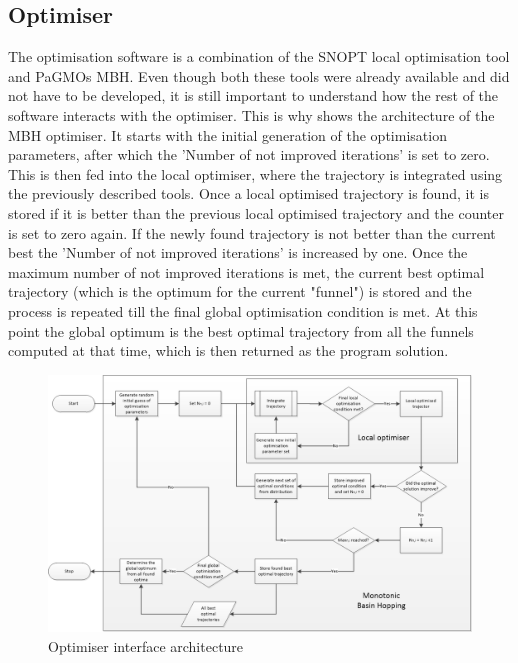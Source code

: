 \subsection{Optimiser}
\label{subsec:optimisersoft}
The optimisation software is a combination of the \ac{SNOPT} local optimisation tool and \ac{PaGMO}s \ac{MBH}. Even though both these tools were already available and did not have to be developed, it is still important to understand how the rest of the software interacts with the optimiser. This is why   shows the architecture of the \ac{MBH} optimiser. It starts with the initial generation of the optimisation parameters, after which the 'Number of not improved iterations' is set to zero. This is then fed into the local optimiser, where the trajectory is integrated using the previously described tools. Once a local optimised trajectory is found, it is stored if it is better than the previous local optimised trajectory and the counter is set to zero again. If the newly found trajectory is not better than the current best the 'Number of not improved iterations' is increased by one. Once the maximum number of not improved iterations is met, the current best optimal trajectory (which is the optimum for the current "funnel") is stored and the process is repeated till the final global optimisation condition is met. At this point the global optimum is the best optimal trajectory from all the funnels computed at that time, which is then returned as the program solution.

\begin{figure}[!ht]
\centering
\includegraphics[width=1.5\textwidth, angle = 90]{figures/software/optimiser.png}
\caption{Optimiser interface architecture}
\label{fig:optimiser}
\end{figure}


